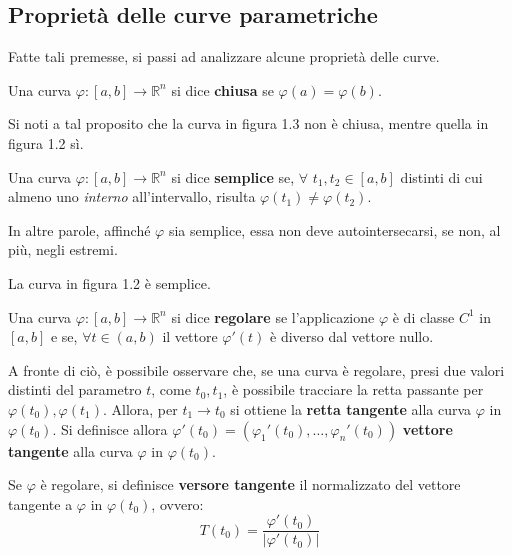 \subsection{Proprietà delle curve parametriche}
Fatte tali premesse, si passi ad analizzare alcune proprietà delle curve.
\begin{definition}
    Una curva $\varphi:[a,b]\to\mathbb{R}^n$ si dice \textbf{chiusa} se $\varphi(a)=\varphi(b)$.
\end{definition}
\begin{oss}
    Si noti a tal proposito che la curva in figura 1.3 non è chiusa, mentre quella in figura 1.2 sì.
\end{oss}
\begin{definition}
    Una curva $\varphi:[a,b] \to \mathbb{R}^n$ si dice \textbf{semplice} se, $\forall$ $ t_1, t_2 \in [a,b]$ distinti di cui almeno uno \textit{interno} all'intervallo, risulta $\varphi(t_1)\neq\varphi(t_2)$.
\end{definition}
    \begin{oss}
        In altre parole, affinché $\varphi$ sia semplice, essa non deve autointersecarsi, se non, al più, negli estremi.
    \end{oss}
    \begin{oss}
        La curva in figura 1.2 è semplice.
    \end{oss}
\begin{definition}
    Una curva $\varphi:[a,b] \to \mathbb{R}^n$ si dice \textbf{regolare} se l'applicazione $\varphi$ è di classe $C^1$ in $[a,b]$ e se, $\forall t \in (a,b)$ il vettore $\varphi'(t)$ è diverso dal vettore nullo.
\end{definition}
A fronte di ciò, è possibile osservare che, se una curva è regolare, presi due valori distinti del parametro $t$, come $t_0, t_1$, è possibile tracciare la retta passante per $\varphi(t_0), \varphi(t_1)$. Allora, per $t_1 \to t_0$ si ottiene la \textbf{retta tangente} alla curva $\varphi$ in $\varphi(t_0)$.
Si definisce allora $\varphi'(t_0)=(\varphi_1'(t_0), \dots, \varphi_n'(t_0))$ \textbf{vettore tangente} alla curva $\varphi$ in $\varphi(t_0)$.
\begin{definition}
    Se $\varphi$ è regolare, si definisce \textbf{versore tangente} il normalizzato del vettore tangente a $\varphi$ in $\varphi(t_0)$, ovvero:
    \begin{equation}
        T(t_0)=\frac{\varphi'(t_0)}{|\varphi'(t_0)|}
    \end{equation}
\end{definition}
